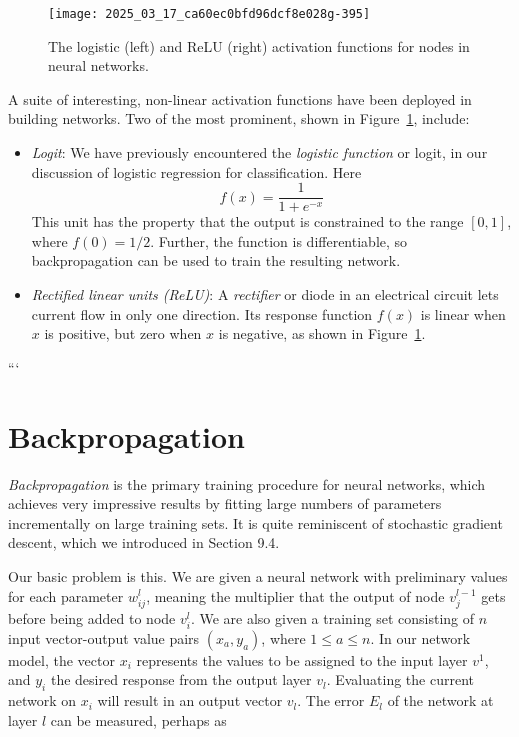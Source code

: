 \documentclass[10pt]{article}
\begin{document}
\begin{enumerate}
\begin{figure}[h]
\centering
\texttt{[image: 2025\_03\_17\_ca60ec0bfd96dcf8e028g-395]}
\caption{The logistic (left) and ReLU (right) activation functions for nodes in neural networks.}
\label{fig:activationfunctions}
\end{figure}

A suite of interesting, non-linear activation functions have been deployed in building networks. Two of the most prominent, shown in Figure~\ref{fig:activationfunctions}, include:

\begin{itemize}
  \item \textit{Logit}: We have previously encountered the \textit{logistic function} or logit, in our discussion of logistic regression for classification. Here
  \[
  f(x) = \frac{1}{1 + e^{-x}}
  \]
  This unit has the property that the output is constrained to the range $[0,1]$, where $f(0)=1/2$. Further, the function is differentiable, so backpropagation can be used to train the resulting network.
  \item \textit{Rectified linear units (ReLU)}: A \textit{rectifier} or diode in an electrical circuit lets current flow in only one direction. Its response function $f(x)$ is linear when $x$ is positive, but zero when $x$ is negative, as shown in Figure~\ref{fig:activationfunctions}.
\end{itemize}
```
\section{Backpropagation}
\textit{Backpropagation} is the primary training procedure for neural networks, which achieves very impressive results by fitting large numbers of parameters incrementally on large training sets. It is quite reminiscent of stochastic gradient descent, which we introduced in Section 9.4.

Our basic problem is this. We are given a neural network with preliminary values for each parameter $w_{ij}^{l}$, meaning the multiplier that the output of node $v_{j}^{l-1}$ gets before being added to node $v_{i}^{l}$. We are also given a training set consisting of $n$ input vector-output value pairs $(x_{a}, y_{a})$, where $1 \leq a \leq n$. In our network model, the vector $x_{i}$ represents the values to be assigned to the input layer $v^{1}$, and $y_{i}$ the desired response from the output layer $v_{l}$. Evaluating the current network on $x_{i}$ will result in an output vector $v_{l}$. The error $E_{l}$ of the network at layer $l$ can be measured, perhaps as


\end{enumerate}
\end{document}
